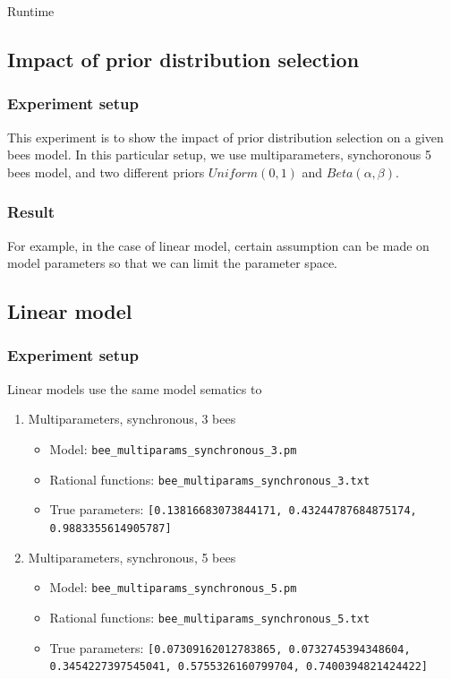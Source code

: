 \documentclass[12pt]{article}
\theoremstyle{definition}
\begin{document}
Runtime


\subsection{Impact of prior distribution selection}
\subsubsection{Experiment setup}
This experiment is to show the impact of prior distribution selection on a given
bees model. In this particular setup, we use multiparameters, synchoronous 5
bees model, and two different priors $Uniform(0,1)$ and $Beta(\alpha, \beta)$.


\subsubsection{Result}

 For example, in the case of linear model, certain assumption can be made on
 model parameters so that we can limit the parameter space. 

\subsection{Linear model}
\subsubsection{Experiment setup}
Linear models use the same model sematics to 
\begin{enumerate}
\item Multiparameters, synchronous, 3 bees
  \begin{itemize}
  \item Model: \texttt{bee\_multiparams\_synchronous\_3.pm}
  \item Rational functions: \texttt{bee\_multiparams\_synchronous\_3.txt}
  \item True parameters: \texttt{[0.13816683073844171, 0.43244787684875174,
      0.9883355614905787]}
  \end{itemize}
\item Multiparameters, synchronous, 5 bees
  \begin{itemize}
  \item Model: \texttt{bee\_multiparams\_synchronous\_5.pm}
  \item Rational functions: \texttt{bee\_multiparams\_synchronous\_5.txt}
  \item True parameters: \texttt{[0.07309162012783865, 0.0732745394348604,
      0.3454227397545041, 0.5755326160799704, 0.7400394821424422]}
  \end{itemize}
\end{enumerate}
\end{document}
